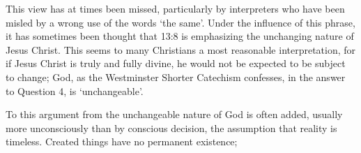 This view has at times been missed, particularly by interpreters who have been
misled by a wrong use of the words `the same'.
Under the influence of this phrase, it has sometimes been thought that 13:8 is
emphasizing the unchanging nature of Jesus Christ.
This seems to many Christians a most reasonable interpretation, for if Jesus
Christ is truly and fully divine, he would not be expected to be subject to
change; God, as the Westminster Shorter Catechism confesses, in the answer to
Question 4, is `unchangeable'.
\newline

To this argument from the unchangeable nature of God is often added, usually
more unconsciously than by conscious decision, the assumption that reality is
timeless.
Created things have no permanent existence;
